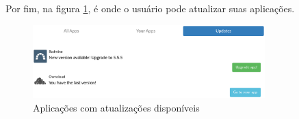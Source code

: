 Por fim, na figura \ref{fig:shakx3}, é onde o usuário pode atualizar suas aplicações.

\begin{figure}[H]
  \centering
  \includegraphics[width=0.8\textwidth]
      {figuras/shak3}
      \caption{Aplicações com atualizações disponíveis}
  \label{fig:shakx3}
\end{figure}

